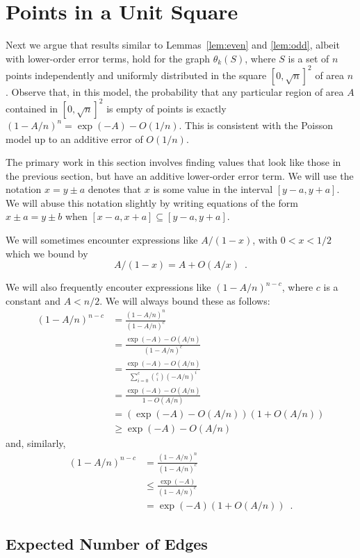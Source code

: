 \documentclass{patmorin}
\begin{document}
\section{Points in a Unit Square}

Next we argue that results similar to Lemmas~\ref{lem:even} and
\ref{lem:odd}, albeit with lower-order error terms, hold for the
graph $\theta_k(S)$, where $S$ is a set of $n$ points independently
and uniformly distributed in the square $[0,\sqrt{n}]^2$ of area $n$.
Observe that, in this model, the probability that any particular region
of area $A$ contained in $[0,\sqrt{n}]^2$ is empty of points is exactly
$(1-A/n)^n=\exp(-A)-O(1/n)$.  This is consistent with the Poisson model
up to an additive error of $O(1/n)$.

The primary work in this section involves finding values that look
like those in the previous section, but have an additive lower-order
error term.  We will use the notation $x= y\pm a$ denotes that $x$ is
some value in the interval $[y-a,y+a]$.  We will abuse this notation
slightly by writing equations of the form $x\pm a = y\pm b$ when
$[x-a,x+a]\subseteq[y-a,y+a]$.

We will sometimes encounter expressions like $A/(1-x)$, with $0<x<1/2$
which we bound by
\[
   A/(1-x) = A+O(A/x) \enspace .
\]

We will also frequently encouter expressions like $(1-A/n)^{n-c}$, where
$c$ is a constant and $A < n/2$.  We will always bound these as follows:
\begin{align*}
   (1-A/n)^{n-c} 
      & = \frac{(1-A/n)^n}{(1-A/n)^c} \\
      & = \frac{\exp(-A)-O(A/n)}{(1-A/n)^c} \\
      & = \frac{\exp(-A)-O(A/n)}{\sum_{i=0}^c \binom{c}{i}(-A/n)^i} \\
      & = \frac{\exp(-A)-O(A/n)}{1-O(A/n)} \\
      & = (\exp(-A)-O(A/n))(1+O(A/n)) \\
      & \ge \exp(-A) - O(A/n) 
\end{align*}
and, similarly, 
\begin{align*}
   (1-A/n)^{n-c} 
      & = \frac{(1-A/n)^n}{(1-A/n)^c} \\
      & \le \frac{\exp(-A)}{(1-A/n)^c} \\
      & = \exp(-A)(1+O(A/n))  \enspace .
\end{align*}


\subsection{Expected Number of Edges}
\end{document}
